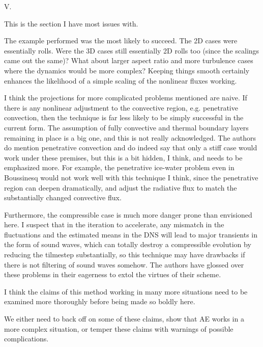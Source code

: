\documentclass[aps, 11pt, singlecolumn]{revtex4-1} %
\begin{document}
\begin{singlespace}
\begin{myquotation}
V.

This is the section I have most issues with.

The example performed was the most likely to succeed. The 2D cases
were essentially rolls. Were the 3D cases still essentially 2D rolls
too (since the scalings came out the same)? What about larger aspect
ratio and more turbulence cases where the dynamics would be more
complex? Keeping things smooth certainly enhances the likelihood of a
simple scaling of the nonlinear fluxes working.

I think the projections for more complicated problems mentioned are
naive. If there is any nonlinear adjustment to the convective region,
e.g. penetrative convection, then the technique is far less likely to
be simply successful in the current form. The assumption of fully
convective and thermal boundary layers remaining in place is a big
one, and this is not really acknowledged. The authors do mention
penetrative convection and do indeed say that only a stiff case would
work under these premises, but this is a bit hidden, I think, and
needs to be emphasized more. For example, the penetrative ice-water
problem even in Boussinesq would not work well with this technique I
think, since the penetrative region can deepen dramatically, and
adjust the radiative flux to match the substantially changed
convective flux.

Furthermore, the compressible case is much more danger prone than
envisioned here. I suspect that in the iteration to accelerate, any
mismatch in the fluctuations and the estimated means in the DNS will
lead to major transients in the form of sound waves, which can totally
destroy a compressible evolution by reducing the tilmestep
substantially, so this technique may have drawbacks if there is not
filtering of sound waves somehow. The authors have glossed over these
problems in their eagerness to extol the virtues of their scheme.

I think the claims of this method working in many more situations need
to be examined more thoroughly before being made so boldly here.
\end{myquotation}
We either need to back off on some of these claims, show that AE works
in a more complex situation, or temper these claims with warnings of
possible complications.



\end{singlespace}
\end{document}
